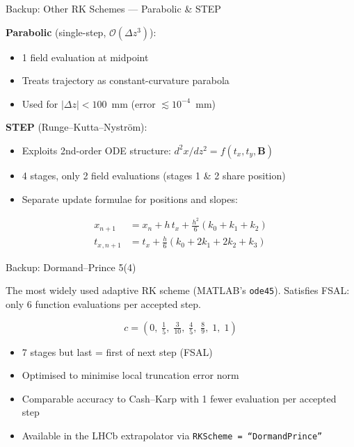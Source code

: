 \documentclass[aspectratio=169, 11pt]{beamer}
\newcommand{\dz}{\Delta z}
\newcommand{\bvec}[1]{\mathbf{#1}}
\newcommand{\tx}{t_x}
\newcommand{\ty}{t_y}
\begin{document}
\begin{frame}{Backup: Other RK Schemes --- Parabolic \& STEP}

\textbf{Parabolic} (single-step, $\mathcal{O}(\dz^3)$):
\begin{itemize}\small
  \item 1 field evaluation at midpoint
  \item Treats trajectory as constant-curvature parabola
  \item Used for $|\dz| < 100$~mm (error $\lesssim 10^{-4}$~mm)
\end{itemize}

\vspace{8pt}
\textbf{STEP} (Runge--Kutta--Nystr\"om):
\begin{itemize}\small
  \item Exploits 2nd-order ODE structure: $d^2x/dz^2 = f(\tx, \ty, \bvec{B})$
  \item 4 stages, only 2 field evaluations (stages 1 \& 2 share position)
  \item Separate update formulae for positions and slopes:
\end{itemize}
\begin{align*}
  x_{n+1} &= x_n + h\,\tx + \frac{h^2}{6}(k_0 + k_1 + k_2) \\[2pt]
  \tx{}_{,n+1} &= \tx + \frac{h}{6}(k_0 + 2k_1 + 2k_2 + k_3)
\end{align*}
\end{frame}


\begin{frame}{Backup: Dormand--Prince 5(4)}

The most widely used adaptive RK scheme (MATLAB's \texttt{ode45}).
Satisfies FSAL: only 6 function evaluations per accepted step.

\begin{equation*}
  c = \left(0,\;\tfrac{1}{5},\;\tfrac{3}{10},\;\tfrac{4}{5},\;
  \tfrac{8}{9},\;1,\;1\right)
\end{equation*}

\vspace{4pt}
\begin{itemize}\small
  \item 7 stages but last = first of next step (FSAL)
  \item Optimised to minimise local truncation error norm
  \item Comparable accuracy to Cash--Karp with 1 fewer evaluation per
        accepted step
  \item Available in the LHCb extrapolator via
        \texttt{RKScheme = ``DormandPrince''}
\end{itemize}
\end{frame}
\end{document}
